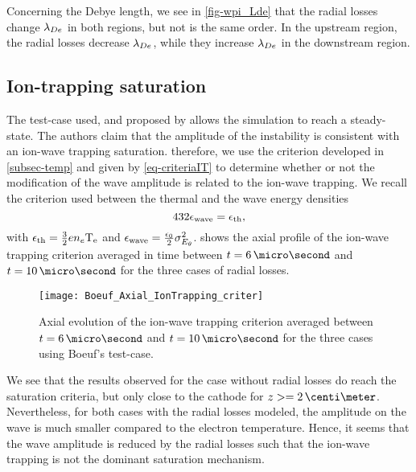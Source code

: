 Concerning the Debye length, we see in \cref{fig-wpi_Lde} that the radial losses change $\lambda_{De}$ in both regions, but not is the same order.
In the upstream region, the radial losses decrease $\lambda_{De}$, while they increase $\lambda_{De}$ in the downstream region.


\subsection{Ion-trapping saturation } \label{subsec-boeuf_iontrapping}

The test-case used, and proposed by \citet{boeuf2018} allows the simulation to reach a steady-state.
The authors claim that the amplitude of the instability is consistent with an ion-wave trapping saturation.
therefore, we use the criterion developed in \cref{subsec-temp} and given by \cref{eq-criteriaIT} to determine whether or not the modification of the wave amplitude is related to the ion-wave trapping.
We recall the criterion used between the thermal and the wave energy densities
\begin{equation} 
  432 \epsilon_{\rm wave} = \epsilon_{\rm th},
\end{equation}
with $\epsilon_{\rm th} = \frac{3}{2} e n_e \mathrm{T_e}$ and $\epsilon_{\rm wave} = \frac{\epsilon_0}{2} \sigma_{E_{\theta}}^2$.
 shows the axial profile of the ion-wave trapping criterion averaged in time between $t=6\,\micro\second$ and $t=10\,\micro\second$ for the three cases of radial losses.

\begin{figure}[hbt]
  \centering
  \texttt{[image: Boeuf\_Axial\_IonTrapping\_criter]}
  \caption{Axial evolution of the ion-wave trapping criterion averaged between $t=6\,\micro\second$ and $t=10\,\micro\second$ for the three cases using Boeuf's test-case. }
  \label{fig-ionwavetrapping_axial}
\end{figure}

We see that the results observed for the case without radial losses do reach the saturation criteria, but only close to the cathode for $z >= 2\,\centi\meter$.
Nevertheless, for both cases with the radial losses modeled, the amplitude on the wave is much smaller compared to the electron temperature.
Hence, it seems that the wave amplitude is reduced by the radial losses such that the ion-wave trapping is not the dominant saturation mechanism.



